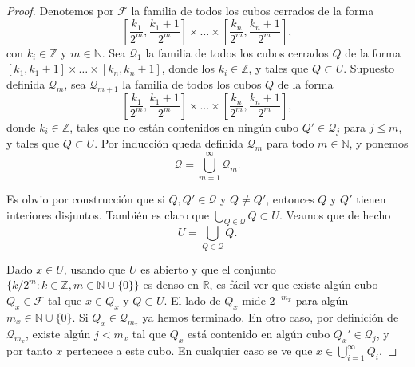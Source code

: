 \begin{proof}
    Denotemos por $\mathcal{F}$ la familia de todos los cubos cerrados de la forma
    \[
        \left[\frac{k_1}{2^m}, \frac{k_1 + 1}{2^m}\right] \times \dots \times \left[\frac{k_n}{2^m}, \frac{k_n + 1}{2^m}\right],
    \]
    con $k_i \in \mathbb{Z}$ y $m \in \mathbb{N}$. Sea $\mathcal{Q}_1$ la familia
    de todos los cubos cerrados $Q$ de la forma $[k_1, k_1 + 1] \times \dots \times
        [k_n, k_n + 1]$, donde los $k_i \in \mathbb{Z}$, y tales que $Q \subset U$.
    Supuesto definida $\mathcal{Q}_m$, sea $\mathcal{Q}_{m+1}$ la familia de todos
    los cubos $Q$ de la forma
    \[
        \left[\frac{k_1}{2^m}, \frac{k_1+1}{2^m}\right] \times \dots \times \left[\frac{k_n}{2^m}, \frac{k_n+1}{2^m}\right],
    \]
    donde $k_i \in \mathbb{Z}$, tales que no están contenidos en ningún cubo $Q'
        \in \mathcal{Q}_j$ para $j \leq m$, y tales que $Q \subset U$. Por inducción
    queda definida $\mathcal{Q}_m$ para todo $m \in \mathbb{N}$, y ponemos
    \[
        \mathcal{Q} = \bigcup_{m=1}^{\infty} \mathcal{Q}_m.
    \]

    Es obvio por construcción que si $Q, Q' \in \mathcal{Q}$ y $Q \neq Q'$,
    entonces $Q$ y $Q'$ tienen interiores disjuntos. También es claro que 
    $\bigcup_{Q \in \mathcal{Q}} Q \subset U$. Veamos que de hecho
    \[
        U = \bigcup_{Q \in \mathcal{Q}} Q.
    \]

    Dado $x \in U$, usando que $U$ es abierto y que el conjunto $\{k/2^m : k \in
        \mathbb{Z}, m \in \mathbb{N} \cup \{0\}\}$ es denso en $\mathbb{R}$, es fácil
    ver que existe algún cubo $Q_x \in \mathcal{F}$ tal que $x \in Q_x$ y $Q
        \subset U$. El lado de $Q_x$ mide $2^{-m_x}$ para algún $m_x \in \mathbb{N}
        \cup \{0\}$. Si $Q_x \in \mathcal{Q}_{m_x}$ ya hemos terminado. En otro caso,
    por definición de $\mathcal{Q}_{m_x}$, existe algún $j < m_x$ tal que $Q_x$
    está contenido en algún cubo $Q_x' \in \mathcal{Q}_j$, y por tanto $x$
    pertenece a este cubo. En cualquier caso se ve que $x \in
        \bigcup_{i=1}^{\infty} Q_i$.
\end{proof}
